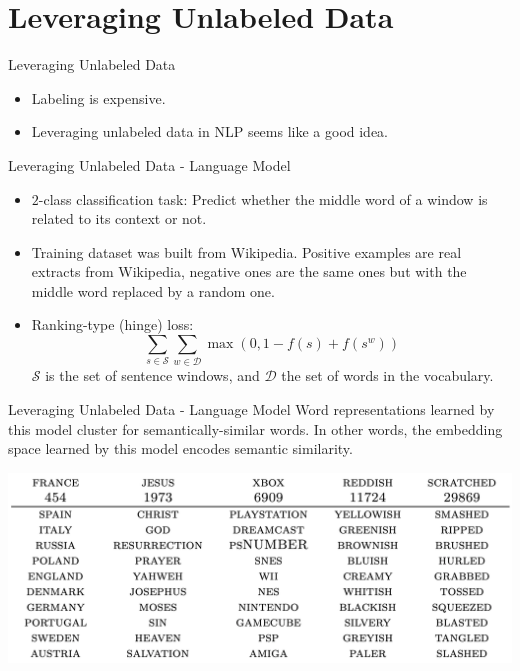 \documentclass[handout]{beamer} %
\begin{document}
  \section{Leveraging Unlabeled Data}
  \begin{frame}{Leveraging Unlabeled Data}
      \begin{itemize}[<+->]
          \item Labeling is expensive.
          \item Leveraging unlabeled data in NLP seems like a good idea.
      \end{itemize}
      
  \end{frame}

  \begin{frame}{Leveraging Unlabeled Data - Language Model}
      \begin{itemize}[<+->]
          \item $2$-class classification task: Predict whether the middle word
              of a window is related to its context or not.
          \item Training dataset was built from Wikipedia. Positive examples are
              real extracts from Wikipedia, negative ones are the same ones but
              with the middle word replaced by a random one.
          \item Ranking-type (hinge) loss:
              $$\sum_{s\in\mathcal{S}}\sum_{w\in\mathcal{D}}\max(0,1-f(s)+f(s^w))$$
              $\mathcal{S}$ is the set of sentence windows, and $\mathcal{D}$ the
              set of words in the vocabulary.
      \end{itemize}
  \end{frame}

  \begin{frame}{Leveraging Unlabeled Data - Language Model}
      Word representations learned by this model cluster for semantically-similar
      words. In other words, the embedding space learned by this model encodes
      semantic similarity.
      \begin{center}
        \pause[\thebeamerpauses]\includegraphics[scale=0.2]{imgs/wordsim.png}
      \end{center}
  \end{frame}
\end{document}
